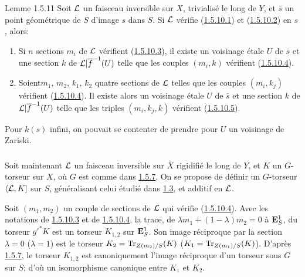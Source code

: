 \documentclass[10pt]{../fichiers-configuration-latex/smfart}
\begin{document}
\begin{enonce*}{Lemme 1.5.11}
Soit ${\mathcal L}$ un faisceau inversible sur $X$, trivialisé le long
de $Y$, et $\bar{s}$ un point géométrique de $S$ d'image $s$ dans
$S$. Si ${\mathcal L}$ vérifie (\hyperref[XVIII.par1.5.10.1]{1.5.10.1}) et
(\hyperref[XVIII.par1.5.10.2]{1.5.10.2}) en $s$, alors:
\begin{enumerate}
\renewcommand{\theenumi}{\Roman{enumi}}
\renewcommand{\labelenumi}{(\theenumi)}
\item Si $n$ sections $m_{i}$ de ${\mathcal L}$ vérifient (\hyperref[XVIII.par1.5.10.3]{1.5.10.3}),
il existe un voisinage étale $U$ de $\bar{s}$ et une section $k$ de
${\mathcal L}|\overline{f}^{-1}(U)$ telle que les couples $(m_{i},k)$ vérifient
(\hyperref[XVIII.par1.5.10.4]{1.5.10.4}).

\item Soient\pageoriginale $m_{1}$, $m_{2}$, $k_{1}$, $k_{2}$ quatre
sections de ${\mathcal L}$ telles que les couples $(m_{i},k_{j})$
vérifient (\hyperref[XVIII.par1.5.10.4]{1.5.10.4}). Il existe alors un voisinage étale $U$ de
$\bar{s}$ et une section $k$ de ${\mathcal L}|\overline{f}^{-1}(U)$ telle que les
triples $(m_{i}, k_{j}, k)$ vérifient (\hyperref[XVIII.par1.5.10.5]{1.5.10.5}). 
\end{enumerate}
\end{enonce*}

Pour $k(s)$ infini, on pouvait se contenter de prendre pour $U$ un
voisinage de Zariski.

\setcounter{subsubsection}{11}
\subsubsection{}
Soit maintenant ${\mathcal L}$ un faisceau inversible sur $\bar{X}$
rigidifié le long de $Y$, et $K$ un $G$-torseur sur $X$, où $G$ est
comme dans \hyperref[XVIII.lem1.5.7]{1.5.7}. On se propose de définir un $G$-torseur
$\langle {\mathcal L},K]$ sur $S$, généralisant celui étudié dans \hyperref[XVIII.subsec1.3]{1.3}, et
additif en ${\mathcal L}$.

Soit $(m_{1},m_{2})$ un couple de sections de ${\mathcal L}$ qui
vérifie (\hyperref[XVIII.par1.5.10.4]{1.5.10.4}). Avec les notations de
\hyperref[XVIII.par1.5.10.3]{1.5.10.3} et de \hyperref[XVIII.par1.5.10.4]{1.5.10.4}, la
trace, de $\lambda m_{1}+(1-\lambda)m_{2}=0$ à $\mathbf{E}^{1}_{S}$,
du torseur ${g'}^{\ast}K$ est un torseur $K_{1,2}$ sur
$\mathbf{E}^{1}_{S}$. Son image réciproque par la section $\lambda =
0$ (\resp $\lambda = 1$) est le torseur $K_{2}=\operatorname{Tr}_{Z(m_{2})/S}(K)$
(\resp $K_{1}=\operatorname{Tr}_{Z(m_{1})/S}(K)$). D'après \hyperref[XVIII.lem1.5.7]{1.5.7}, le torseur
$K_{1,2}$ est canoniquement l'image réciproque d'un torseur sous $G$
sur $S$; d'où un isomorphisme canonique entre $K_{1}$ et $K_{2}$.
\end{document}
